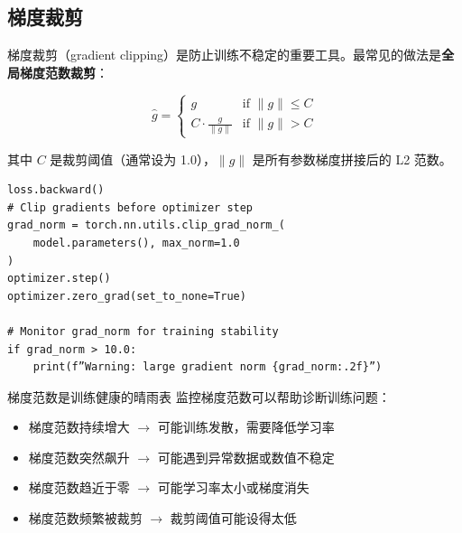 \subsection{梯度裁剪}

梯度裁剪（gradient clipping）是防止训练不稳定的重要工具。最常见的做法是\textbf{全局梯度范数裁剪}：

$$
\hat{g} = \begin{cases}
g & \text{if } \|g\| \leq C \\
C \cdot \frac{g}{\|g\|} & \text{if } \|g\| > C
\end{cases}
$$

其中 $C$ 是裁剪阈值（通常设为 1.0），$\|g\|$ 是所有参数梯度拼接后的 L2 范数。

\begin{lstlisting}[caption={梯度裁剪的标准用法}]
loss.backward()
# Clip gradients before optimizer step
grad_norm = torch.nn.utils.clip_grad_norm_(
    model.parameters(), max_norm=1.0
)
optimizer.step()
optimizer.zero_grad(set_to_none=True)

# Monitor grad_norm for training stability
if grad_norm > 10.0:
    print(f”Warning: large gradient norm {grad_norm:.2f}”)
\end{lstlisting}

\begin{importantbox}{梯度范数是训练健康的晴雨表}
监控梯度范数可以帮助诊断训练问题：
\begin{itemize}
    \item 梯度范数持续增大 $\to$ 可能训练发散，需要降低学习率
    \item 梯度范数突然飙升 $\to$ 可能遇到异常数据或数值不稳定
    \item 梯度范数趋近于零 $\to$ 可能学习率太小或梯度消失
    \item 梯度范数频繁被裁剪 $\to$ 裁剪阈值可能设得太低
\end{itemize}
\end{importantbox}

